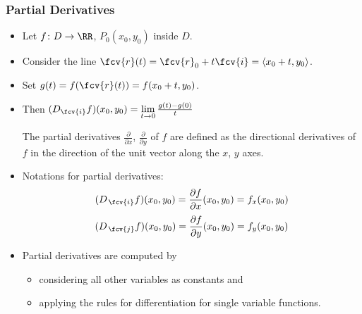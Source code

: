 \begin{frame}
\frametitle{Partial Derivatives}
\begin{itemize} 
\item Let $f\colon D \to \RR$,  $P_0(x_0,y_0)$ inside $D$.
\item<2-> Consider the line $\fcv{r}(t) = \fcv{r}_0 + t\fcv {i} = \langle x_0+t, y_0 \rangle$.
\item<3-> Set $g(t) = f(\fcv{r}(t)) = f(x_0+t, y_0)$.
\item<4-> Then $(D_{\fcv{i}} f)(x_0,y_0) = \lim\limits_{t\to 0} \frac{g(t)-g(0)}{t}$
\begin{definition}
The partial derivatives $\frac{\partial}{\partial x} $, $\frac{\partial}{\partial y} $  of $f$ are defined as the directional derivatives of $f$ in the direction of the unit vector along the $x$, $y$ axes. 
\end{definition}
\item<5-> Notations for \alert<1->{partial derivatives}:
$$(D_{\,\fcv{i}}f)(x_0,y_0) = \frac{\partial f}{\partial x}(x_0,y_0) =
f_x(x_0,y_0)$$
$$(D_{\,\fcv{j}}f)(x_0,y_0) =  \frac{\partial f}{\partial y}(x_0,y_0) =
f_y(x_0,y_0)$$
%
\item<6-> Partial derivatives are computed by
\begin{itemize}
\item considering all other variables as constants and
\item applying the rules for differentiation for single variable functions.
\end{itemize}
\end{itemize}
\end{frame}